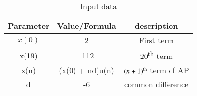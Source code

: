 \begin{table}[h]
    \centering
    \begin{tabular}{|c|c|c|}
        \hline
        \textbf{Parameter} & \textbf{Value/Formula} & \textbf{description}\\
        \hline
        \(x(0)\) & 2 & First term\\
        \hline
        x(19) & -112 & 20\textsuperscript{th} term\\
        \hline
        x(n) & (x(0) + nd)u(n) & $(n+1)\textsuperscript{th}$ term of AP\\
        \hline
        d & -6 & common difference\\
        \hline
    \end{tabular}
    \caption{Input data}
  \label{input data}
\end{table}
